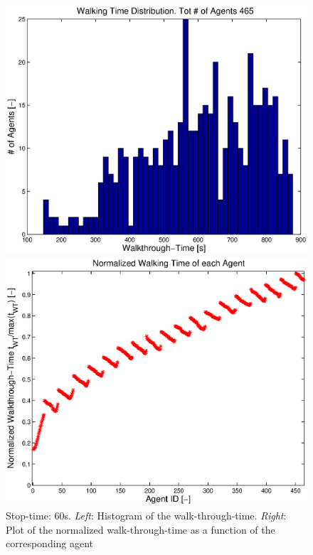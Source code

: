 \documentclass[11pt]{article}
\begin{document}
\begin{figure}
 	\begin{minipage}{0.48\textwidth}
		\includegraphics[width = \textwidth]{Images/RESULTS01_Stop60/WalkingTimeHist.eps}
 	 \end{minipage}
  	\hfill
  	\begin{minipage}{0.48\textwidth}
   		 \includegraphics[width = \textwidth]{Images/RESULTS01_Stop60/NormalizedWalkingTimePlot.eps}
  	\end{minipage}
  	\caption{Stop-time: 60s. \emph{Left}: Histogram of the walk-through-time. \emph{Right}: Plot of the normalized walk-through-time as a function of the corresponding agent}
  	\label{img:stopTime60WTT}
\end{figure}
\end{document}

